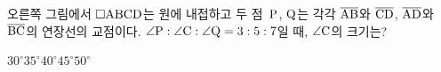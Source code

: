 \noindent\begin{minipage}[t]{0.58\linewidth}\vspace{0pt}\raggedright 오른쪽 그림에서 $\square\mathrm{ABCD}$는 원에 내접하고 두 점~$\mathrm{P}$, $\mathrm{Q}$는 각각 $\overline{\mathrm{AB}}$와 $\overline{\mathrm{CD}}$, $\overline{\mathrm{AD}}$와 $\overline{\mathrm{BC}}$의 연장선의 교점이다. $\angle\mathrm{P}:\angle\mathrm{C}:\angle\mathrm{Q}=3:5:7$일 때, $\angle\mathrm{C}$의 크기는?\end{minipage}\hfill\begin{minipage}[t]{0.4\linewidth}\vspace{0pt}\centering \resizebox{\ifdim\width>\linewidth\linewidth\else\width\fi}{!}{}\end{minipage}\par
\begin{choices32}{$30^\circ$}{$35^\circ$}{$40^\circ$}{$45^\circ$}{$50^\circ$}\end{choices32}
